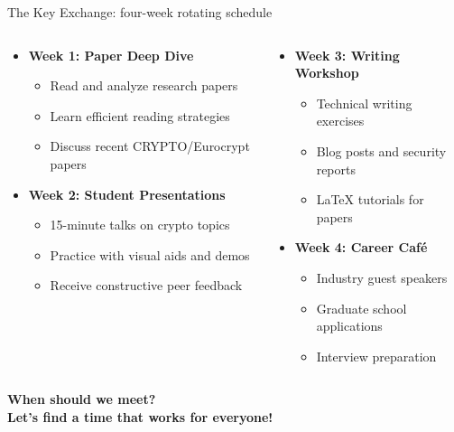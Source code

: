 \documentclass[aspectratio=169, lualatex, handout]{beamer}
\begin{document}
\begin{frame}{The Key Exchange: four-week rotating schedule}
	\begin{columns}[c]
		\begin{column}{0.5\textwidth}
			\begin{itemize}[<+->]
				\item \textbf{Week 1: Paper Deep Dive}
				      \begin{itemize}
					      \item Read and analyze research papers
					      \item Learn efficient reading strategies
					      \item Discuss recent CRYPTO/Eurocrypt papers
				      \end{itemize}
				\item \textbf{Week 2: Student Presentations}
				      \begin{itemize}
					      \item 15-minute talks on crypto topics
					      \item Practice with visual aids and demos
					      \item Receive constructive peer feedback
				      \end{itemize}
			\end{itemize}
		\end{column}
		\begin{column}{0.5\textwidth}
			\begin{itemize}[<+->]
				\item \textbf{Week 3: Writing Workshop}
				      \begin{itemize}
					      \item Technical writing exercises
					      \item Blog posts and security reports
					      \item LaTeX tutorials for papers
				      \end{itemize}
				\item \textbf{Week 4: Career Café}
				      \begin{itemize}
					      \item Industry guest speakers
					      \item Graduate school applications
					      \item Interview preparation
				      \end{itemize}
			\end{itemize}
		\end{column}
	\end{columns}
	\pause
	\vspace{0.1cm}
	\begin{center}
		\Large\textcolor{cipherprimary}{\textbf{When should we meet? \\ Let's find a time that works for everyone!}}
	\end{center}
\end{frame}
\end{document}
